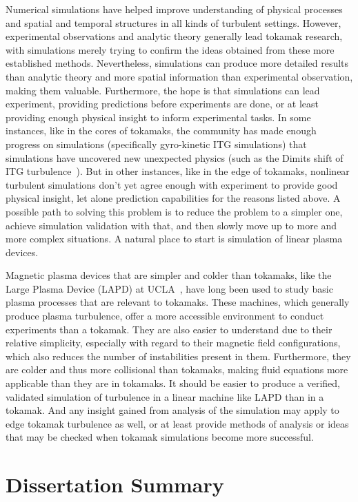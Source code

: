 Numerical simulations have helped improve understanding of physical processes and spatial and temporal structures in all kinds of turbulent settings. However,
experimental observations and analytic theory generally lead tokamak research, with simulations merely trying to confirm the ideas obtained from these more established methods.
Nevertheless, simulations can produce more detailed results than analytic theory and more spatial information than experimental observation, making them valuable.
Furthermore, the hope is that simulations can lead experiment, providing predictions before experiments are done, or at least providing enough physical insight to inform experimental tasks.
In some instances, like in the cores of tokamaks, the community has made enough progress on simulations (specifically gyro-kinetic ITG simulations) that simulations have uncovered new
unexpected physics (such as the Dimits shift of ITG turbulence~\cite{dimits2000}). But in other instances, like in the edge of tokamaks, nonlinear turbulent simulations don't yet
agree enough with experiment to provide good physical insight, let alone prediction capabilities for the reasons listed above. A possible path to solving this problem is to reduce the problem
to a simpler one, achieve simulation validation with that, and then slowly move up to more and more complex situations. A natural place to start is simulation of linear plasma devices.

Magnetic plasma devices that are simpler and colder than tokamaks, like the Large Plasma Device (LAPD) at UCLA~\cite{Gekelman1991}, have long been used to study basic plasma processes that
are relevant to tokamaks. These machines, which generally produce plasma turbulence, offer a more accessible environment to conduct experiments than a tokamak. They are also easier to
understand due to their relative simplicity, especially with regard to their magnetic field configurations, which also reduces the number of instabilities present in them. 
Furthermore, they are colder and thus more collisional than tokamaks, making fluid equations more applicable than they are in tokamaks. It should be easier to produce a verified, validated
simulation of turbulence in a linear machine like LAPD than in a tokamak. And any insight gained from analysis of the simulation may apply to edge tokamak turbulence as well, or at least
provide methods of analysis or ideas that may be checked when tokamak simulations become more successful.

\section{Dissertation Summary}
\label{s_summary}

